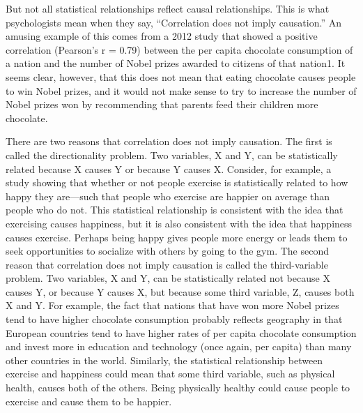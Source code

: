\documentclass[]{book}
\theoremstyle{definition}
\theoremstyle{definition}
\theoremstyle{remark}
\begin{document}
But not all statistical relationships reflect causal relationships. This
is what psychologists mean when they say, ``Correlation does not imply
causation.'' An amusing example of this comes from a 2012 study that
showed a positive correlation (Pearson's r = 0.79) between the per
capita chocolate consumption of a nation and the number of Nobel prizes
awarded to citizens of that nation1. It seems clear, however, that this
does not mean that eating chocolate causes people to win Nobel prizes,
and it would not make sense to try to increase the number of Nobel
prizes won by recommending that parents feed their children more
chocolate.

There are two reasons that correlation does not imply causation. The
first is called the directionality problem. Two variables, X and Y, can
be statistically related because X causes Y or because Y causes X.
Consider, for example, a study showing that whether or not people
exercise is statistically related to how happy they are---such that
people who exercise are happier on average than people who do not. This
statistical relationship is consistent with the idea that exercising
causes happiness, but it is also consistent with the idea that happiness
causes exercise. Perhaps being happy gives people more energy or leads
them to seek opportunities to socialize with others by going to the gym.
The second reason that correlation does not imply causation is called
the third-variable problem. Two variables, X and Y, can be statistically
related not because X causes Y, or because Y causes X, but because some
third variable, Z, causes both X and Y. For example, the fact that
nations that have won more Nobel prizes tend to have higher chocolate
consumption probably reflects geography in that European countries tend
to have higher rates of per capita chocolate consumption and invest more
in education and technology (once again, per capita) than many other
countries in the world. Similarly, the statistical relationship between
exercise and happiness could mean that some third variable, such as
physical health, causes both of the others. Being physically healthy
could cause people to exercise and cause them to be happier.
\end{document}
